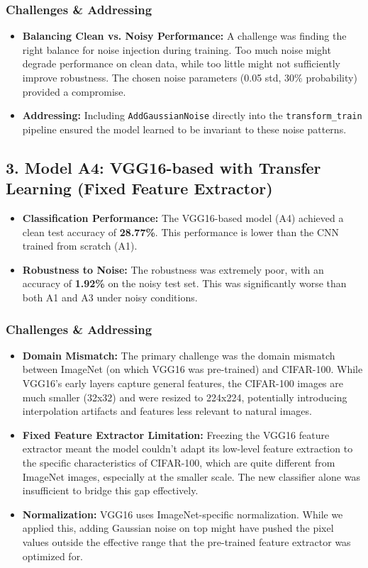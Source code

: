 \documentclass{article}
\begin{document}
\subsubsection*{Challenges \& Addressing}
\begin{itemize}
    \item \textbf{Balancing Clean vs. Noisy Performance:} A challenge was finding the right balance for noise injection during training. Too much noise might degrade performance on clean data, while too little might not sufficiently improve robustness. The chosen noise parameters (0.05 std, 30\% probability) provided a compromise.
    \item \textbf{Addressing:} Including \texttt{AddGaussianNoise} directly into the \texttt{transform\_train} pipeline ensured the model learned to be invariant to these noise patterns.
\end{itemize}

\subsection*{3. Model A4: VGG16-based with Transfer Learning (Fixed Feature Extractor)}

\begin{itemize}
    \item \textbf{Classification Performance:} The VGG16-based model (A4) achieved a clean test accuracy of \textbf{28.77\%}. This performance is lower than the CNN trained from scratch (A1).
    \item \textbf{Robustness to Noise:} The robustness was extremely poor, with an accuracy of \textbf{1.92\%} on the noisy test set. This was significantly worse than both A1 and A3 under noisy conditions.
\end{itemize}

\subsubsection*{Challenges \& Addressing}
\begin{itemize}
    \item \textbf{Domain Mismatch:} The primary challenge was the domain mismatch between ImageNet (on which VGG16 was pre-trained) and CIFAR-100. While VGG16's early layers capture general features, the CIFAR-100 images are much smaller (32x32) and were resized to 224x224, potentially introducing interpolation artifacts and features less relevant to natural images.
    \item \textbf{Fixed Feature Extractor Limitation:} Freezing the VGG16 feature extractor meant the model couldn't adapt its low-level feature extraction to the specific characteristics of CIFAR-100, which are quite different from ImageNet images, especially at the smaller scale. The new classifier alone was insufficient to bridge this gap effectively.
    \item \textbf{Normalization:} VGG16 uses ImageNet-specific normalization. While we applied this, adding Gaussian noise on top might have pushed the pixel values outside the effective range that the pre-trained feature extractor was optimized for.
\end{itemize}
\end{document}
